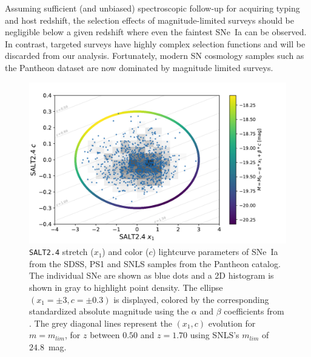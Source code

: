 \documentclass[]{aa} %
\begin{document}
Assuming sufficient (and unbiased) spectroscopic follow-up for acquiring typing
and host redshift, the selection effects of magnitude-limited surveys should be
negligible below a given redshift where even the faintest SNe~Ia can be observed.
In contrast, targeted surveys have highly complex selection functions and will
be discarded from our analysis. Fortunately, modern SN cosmology samples such as
the Pantheon dataset are now dominated by magnitude limited surveys.

\begin{figure}
    \centering
    \includegraphics[width=0.95\linewidth]{Article_figures/zmax_maglim_snls.pdf}
    \caption{\textsc{\texttt{SALT2.4}} stretch ($x_1$) and color ($c$)
        lightcurve parameters of SNe~Ia from the SDSS, PS1 and SNLS samples from
        the Pantheon catalog.  The individual SNe are shown as blue dots and a
        2D histogram is shown in gray to highlight point density. The ellipse
        $(x_1=\pm3, c=\pm0.3)$ is displayed, colored by the corresponding
        standardized absolute magnitude using the $\alpha$ and $\beta$
        coefficients from \cite{scolnic2018a}. The grey diagonal lines represent
    the $(x_1, c)$ evolution for $m = m_{lim}$, for $z$ between $0.50$ and
$z=1.70$ using SNLS's $m_{lim}$ of $24.8$~mag.}
    \label{fig:maglim}
\end{figure}
\end{document}
